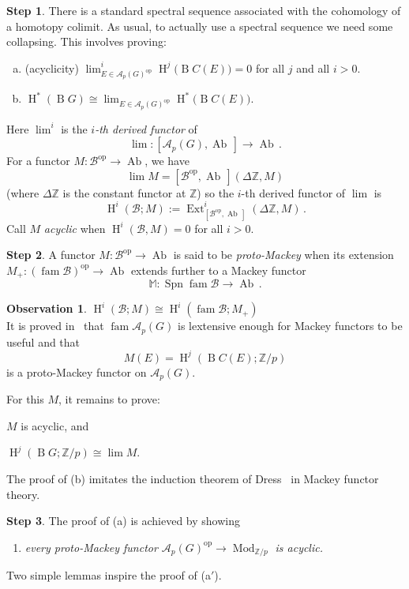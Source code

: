 \documentclass[a4paper,12pt]{article}
\theoremstyle{definition}
\newtheorem*{Observation}{Observation}%
\theoremstyle{fact}
\theoremstyle{genquest}
\theoremstyle{step}
\newtheorem{step}{Step}[subsection]
\newcommand{\catA}{\mathcal{A}}
\newcommand{\Ab}{\operatorname{Ab}}
\newcommand{\catB}{\mathcal{B}}
\newcommand{\classB}{\operatorname{B}}
\newcommand{\BC}{\classB C}
\newcommand{\Ext}{\operatorname{Ext}}
\newcommand{\coHom}{\operatorname{H}}
\newcommand{\MM}{\mathbb{M}}
\newcommand{\Mod}{\operatorname{Mod}}
\newcommand{\Spn}{\operatorname{Spn}}
\newcommand{\ZZ}{\mathbb{Z}}
\newcommand{\ffam}{\operatorname{fam}}
\newcommand{\op}{\operatorname{op}}
\newcommand{\longto}{\longrightarrow}
\begin{document}
\begin{step}
There is a standard spectral sequence associated with the cohomology of a homotopy colimit.   
As usual, to actually use a spectral sequence we need some collapsing.   
This involves proving:
 \begin{enumerate}[(a)]
\item %
(acyclicity) \quad $\lim_{E \in {\catA_{p}(G)}^{\op}}^{i} \coHom^{j}\bigl(\BC(E)\bigr) = 0$ for all $j$ and all $i>0$.
%
\item %
$ \coHom^\ast (\classB G) \cong \lim_{E \in \catA_p (G)^{\op}} \coHom^\ast \bigl(\BC(E)\bigr)$.
\end{enumerate} 
%
Here $\lim^i$ is the \emph{$i$-th derived functor} of
 \[
 \lim : [\catA_p (G) ,\Ab \,] \longto\Ab \,.
 \]
 For a functor $M : \catB^{\op}  \to\Ab  $, we have
 \[
 \lim M = [\catB^{\op}  ,\Ab \,] (\Delta \ZZ , M)
 \]
(where $\Delta \ZZ$ is the constant functor at $\ZZ$) so the $i$-th derived functor of $\lim$ is
 \[
 \coHom^i (\catB;M) := \Ext ^i_{[\catB^{\op},\Ab \,]} (\Delta \ZZ , M)\,.
 \]
 Call $M$ \emph{acyclic} when $ \coHom^i (\catB,M)=0$ for all $i>0$.
\end{step}

\begin{step}
A functor $M : \catB^{\op} \to\Ab  $ is said to be \emph{proto-Mackey} 
when its extension $M_+ : (\ffam \catB)^{\op} \to\Ab  $ extends further to a Mackey functor
 \[
 \MM : \Spn  \ffam \catB \longto\Ab \,.
 \]
\end{step}
 
\begin {Observation}
 $ \coHom^i (\catB;M) \cong  \coHom^i (\ffam  \catB; M_+)$\\ 
It is proved in~\cite{JackMcC1992} that $\ffam \catA_p(G)$ is lextensive enough for Mackey functors to be useful and that
 \[
 M(E) = \coHom^j (\BC(E);\ZZ /p)
 \]
is a proto-Mackey functor on $\catA_p (G)$.
\end {Observation}
%
For this $M$, it remains to prove:
\begin{inparaenum}[(a)]
\item %
$M$ is acyclic, and
\item %
$\coHom^j (\classB G ; \ZZ /p) \cong \lim M$.
\end{inparaenum}
%
The proof of (b) imitates the induction theorem of Dress~\cite{Dress1973} in Mackey functor theory.

\begin{step}
The proof of (a) is achieved by showing 
\begin{enumerate}[(a$'$)] 
\item \itshape 
every proto-Mackey functor
 $ \catA_p (G)^{\op}  \longto \Mod_{\ZZ /p} $
is acyclic.
\end{enumerate}

\noindent
Two simple lemmas inspire the proof of (a$'$).
\end{step}
\end{document}
